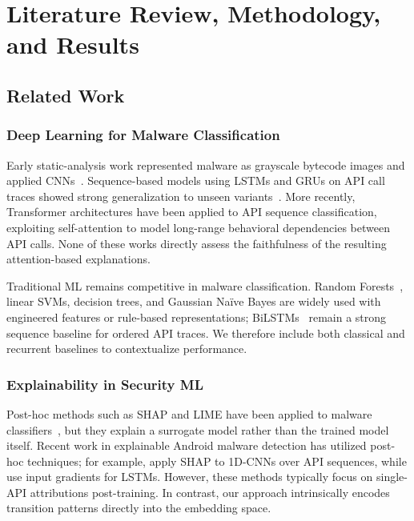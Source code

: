 \documentclass[12pt]{report}
\begin{document}
\chapter{Literature Review, Methodology, and Results}

\section{Related Work}

\subsection{Deep Learning for Malware Classification}
Early static-analysis work represented malware as grayscale bytecode
images and applied CNNs~\citep{nataraj2011malware}. Sequence-based models
using LSTMs and GRUs on API call traces showed strong generalization to
unseen variants~\citep{ye2019deep}. More recently, Transformer
architectures have been applied to API sequence classification, exploiting
self-attention to model long-range behavioral dependencies between API
calls. None of these works directly assess the faithfulness of the
resulting attention-based explanations.

Traditional ML remains competitive in malware classification. Random
Forests~\citep{breiman2001rf}, linear SVMs, decision trees, and Gaussian
Na\"{i}ve Bayes are widely used with engineered features or rule-based
representations; BiLSTMs~\citep{hochreiter1997lstm} remain a strong
sequence baseline for ordered API traces. We therefore include both
classical and recurrent baselines to contextualize performance.

\subsection{Explainability in Security ML}
Post-hoc methods such as SHAP and LIME have been applied to malware
classifiers~\citep{lundberg2017shap}, but they explain a surrogate model
rather than the trained model itself. Recent work in explainable Android malware detection has utilized post-hoc techniques; for example, \citet{soi2024enhancing} apply SHAP to 1D-CNNs over API sequences, while \citet{wu2021why} use input gradients for LSTMs. However, these methods typically focus on single-API attributions post-training. In contrast, our approach intrinsically encodes transition patterns directly into the embedding space.
\end{document}
